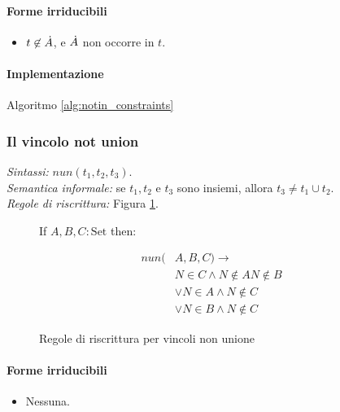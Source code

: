 \documentclass[12pt,a4paper,openright]{book} %
\begin{document}
\paragraph{Forme irriducibili}
\begin{itemize}
	\item $t \not\in \dot{A}$, e $\dot{A}$ non occorre in $t$.
\end{itemize}

\paragraph{Implementazione}
Algoritmo \ref{alg:notin_constraints}

\subsubsection{Il vincolo not union}

\textit{Sintassi:} $nun(t_1,t_2,t_3)$.\\
\noindent\textit{Semantica informale:} se $t_1, t_2$ e $t_3$ sono insiemi, allora $t_3 \neq t_1 \cup t_2$.\\
\noindent\textit{Regole di riscrittura:} Figura \ref{fig:notun_constraints}.

\begin{figure}
	\begin{tcolorbox}[colframe=black, colback=white, sharp corners]
		\setcounter{equation}{13}
		\renewcommand{\theequation}{$\cup$\textsubscript{\arabic{equation}}}

		If $A, B, C: \text{Set}$ then:

		\begin{equation}
		\begin{split}
		nun(& A,B,C) \to \\
		  & N \in C \land N \not\in A N \not\in B \\
		  & \lor N \in A \land N \not\in C \\
		  & \lor N \in B \land N \not\in C
		\end{split}
		\end{equation}

	\end{tcolorbox}

	\caption{Regole di riscrittura per vincoli non unione}
	\label{fig:notun_constraints}
\end{figure}

\paragraph{Forme irriducibili}
\begin{itemize}
	\item Nessuna.
\end{itemize}
\end{document}
